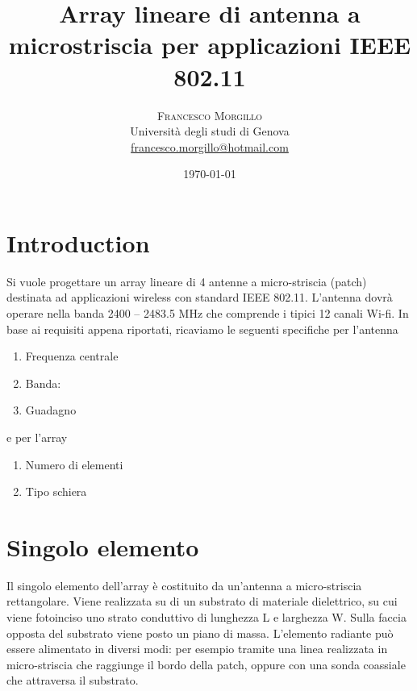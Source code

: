 \documentclass[twoside,twocolumn]{article}
\title{Array lineare di antenna a microstriscia per applicazioni IEEE 802.11} %
\author{%
\textsc{Francesco Morgillo}\\[1ex] %
\normalsize Università degli studi di Genova \\ %
\normalsize \href{mailto:francesco.morgillo@hotmail.com}{francesco.morgillo@hotmail.com} %
}
\date{\today} %
\begin{document}
\maketitle


\section{Introduction}


Si vuole progettare un array lineare di 4 antenne a micro-striscia (patch) destinata ad applicazioni wireless con standard IEEE 802.11.
L'antenna dovrà operare nella banda 2400 – 2483.5 MHz che comprende i tipici 12 canali Wi-fi.
In base ai requisiti appena riportati, ricaviamo le seguenti specifiche per l'antenna

\begin{enumerate}[noitemsep] %
\item Frequenza centrale
\item Banda: 
\item Guadagno
\end{enumerate}
 e per l'array
 \begin{enumerate}[noitemsep] %
\item Numero di elementi
\item Tipo schiera
\end{enumerate}



\section{Singolo elemento}
Il singolo elemento dell'array è costituito da un'antenna a micro-striscia rettangolare.
Viene realizzata su di un substrato di materiale dielettrico, su cui viene fotoinciso uno strato conduttivo di lunghezza L e larghezza W. Sulla faccia opposta del substrato viene posto un piano di massa. L'elemento radiante può essere alimentato in diversi modi: per esempio tramite una linea realizzata in micro-striscia che raggiunge il bordo della patch, oppure con una sonda coassiale che attraversa il substrato.
\end{document}
